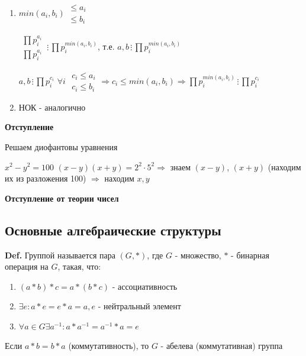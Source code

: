 \documentclass[14pt, letter paper]{article}
\begin{document}
\begin{enumerate}
    \item $min(a_i, b_i) \begin{gathered} \leq a_i \\ \leq b_i \end{gathered}$

    $\begin{gathered} \prod p_i^{a_i} \\ \prod p_i^{a_i} \end{gathered} \, \vdots \, \prod p_i^{min(a_i, b_i)}$, т.е. $a, b \, \vdots \, \prod p_i^{min(a_i, b_i)}$

    $a, b \, \vdots \, \prod p_i^{c_i}$ $\forall i$ $\begin{gathered} c_i \leq a_i \\ c_i \leq b_i \end{gathered} \Rightarrow c_i \leq min(a_i, b_i) \Rightarrow \prod p_i^{min(a_i, b_i)} \, \vdots \, \prod p_i^{c_i}$

    \item НОК - аналогично
\end{enumerate}

\textbf{Отступление}

Решаем диофантовы уравнения

$x^2 - y^2 = 100$ $(x-y)(x+y) = 2^2 \cdot 5^2 \Rightarrow$ знаем $(x - y)$, $(x + y)$ (находим их из разложения 100) $\Rightarrow$ находим $x, y$

\textbf{Отступление от теории чисел}

\begin{center}
    \section*{Основные алгебраические структуры}
\end{center}

\textbf{Def.} Группой называется пара $(G, *)$, где $G$ - множество, $*$ - бинарная операция на $G$, такая, что:
\begin{enumerate}
    \item $(a * b) * c = a * (b * c)$ - ассоциативность
    \item $\exists e: a * e = e * a = a, e$ - нейтральный элемент
    \item $\forall a \in G \exists a^{-1}: a * a^{-1} = a^{-1} * a = e$
\end{enumerate}

Если $a * b = b * a$ (коммутативность), то $G$ - абелева (коммутативная) группа
\end{document}
